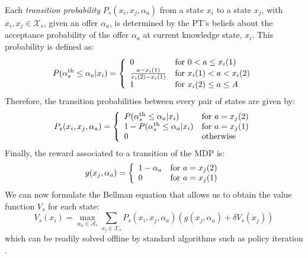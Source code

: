 Each \textit{transition probability} $P_s(x_i,x_j,\alpha_a)$ from a state $x_i$ to a state $x_j$, with $x_i, x_j \in \mathcal{X}_s$, given an offer $\alpha_a$, is determined by the PT's beliefs about the acceptance probability of the offer $\alpha_a$ at current knowledge state, $x_i$. This probability is defined as:
\begin{equation}
 P(\alpha_s^{\text{th}} \leq \alpha_a|x_i) = \left\{ 
  \begin{array}{l l}
    0 & \text{for } 0 < a \leq x_i(1)\\
    \frac{a-x_i(1)}{x_i(2)-x_i(1)} & \text{for } x_i(1) < a < x_i(2) \\
    1 & \text{for } x_i(2) \leq a \leq A 
  \end{array} \right.
\end{equation}
Therefore, the transition probabilities between every pair of states are given by:
\begin{equation}
 P_s(x_i,x_j,\alpha_a) = \left\{ 
  \begin{array}{l l}
    P(\alpha_s^{\text{th}}\leq\alpha_a|x_i) & \text{for } a = x_j(2)\\
    1 - P(\alpha_s^{\text{th}}\leq\alpha_a|x_i) & \text{for } a = x_j(1)\\
    0 & \text{otherwise}
  \end{array} \right.
\end{equation}
Finally, the reward associated to a transition of the MDP is: 
\begin{equation}
g(x_j,\alpha_a) = \left\{ 
  \begin{array}{l l}
    1 - \alpha_a & \text{for } a = x_j(2)\\
    0 & \text{for } a = x_j(1)\\
  \end{array} \right.
\end{equation}
We can now formulate the Bellman equation that allows us to obtain the value function $V_s$ for each state:
\begin{equation}\label{eq:MDP}
V_s(x_i) = \max_{\alpha_a \in \mathcal{A}_s} \sum_{x_j \in \mathcal{X}_s} P_s(x_i,x_j,\alpha_a)(g(x_j,\alpha_a)+\delta V_s(x_j))
\end{equation}
which can be readily solved offline by standard algorithms such as policy iteration \cite{ref:Bertsekas2005}.

